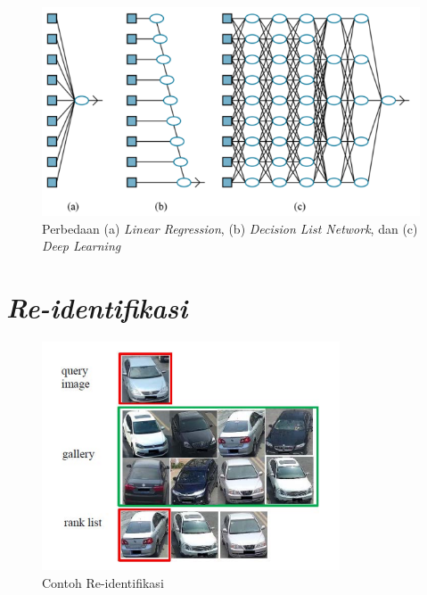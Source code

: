 \begin{figure}[ht]
  \centering
  \includegraphics[scale=0.7]{gambar/Jaringan Deep learning.png}
  \caption{Perbedaan (a) \emph{Linear Regression}, (b) \emph{Decision List Network}, dan (c) \emph{Deep Learning}}
  \label{fig:perbedaanlinearregressiondecissionlistnetworkdeeplearning}
\end{figure}

\section{\emph{Re-identifikasi}}
\label{sec:re-identifikasi}

\begin{figure}[ht]
  \centering
  \includegraphics[scale=1]{gambar/Contoh Re-identification.png}
  \caption{Contoh Re-identifikasi}
  \label{fig:contohreidentifikasi}
\end{figure}

